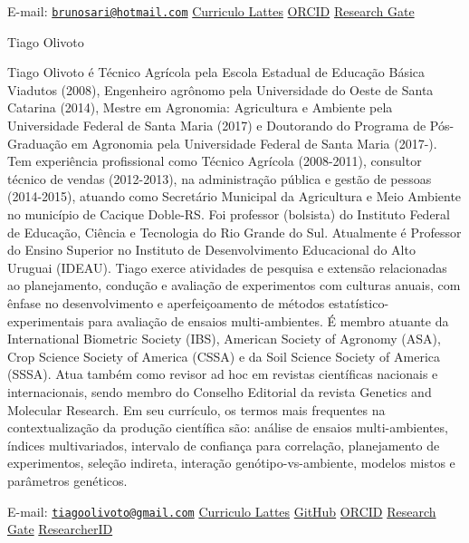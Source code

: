 \documentclass[
]{book}
\numberwithin{equation}{section}
\begin{document}
E-mail:
\href{mailto:brunosari@hotmail.com}{\nolinkurl{brunosari@hotmail.com}}
\textbar{}
\href{http://buscatextual.cnpq.br/buscatextual/visualizacv.do?id=K4406856U6}{Curriculo
Lattes} \textbar{} \href{https://orcid.org/0000-0003-3405-9628}{ORCID}
\textbar{}
\href{https://www.researchgate.net/profile/Bruno_Sari}{Research Gate}

\vspace{0.5cm}

\LARGE 
Tiago Olivoto

\normalsize
Tiago Olivoto é Técnico Agrícola pela Escola Estadual de Educação Básica Viadutos (2008), Engenheiro agrônomo pela Universidade do Oeste de Santa Catarina (2014), Mestre em Agronomia: Agricultura e Ambiente pela Universidade Federal de Santa Maria (2017) e Doutorando do Programa de Pós-Graduação em Agronomia pela Universidade Federal de Santa Maria (2017-). Tem experiência profissional como Técnico Agrícola (2008-2011), consultor técnico de vendas (2012-2013), na administração pública e gestão de pessoas (2014-2015), atuando como Secretário Municipal da Agricultura e Meio Ambiente no município de Cacique Doble-RS. Foi professor (bolsista) do Instituto Federal de Educação, Ciência e Tecnologia do Rio Grande do Sul. Atualmente é Professor do Ensino Superior no Instituto de Desenvolvimento Educacional do Alto Uruguai (IDEAU). Tiago exerce atividades de pesquisa e extensão relacionadas ao planejamento, condução e avaliação de experimentos com culturas anuais, com ênfase no desenvolvimento e aperfeiçoamento de métodos estatístico-experimentais para avaliação de ensaios multi-ambientes. É membro atuante da International Biometric Society (IBS), American Society of Agronomy (ASA), Crop Science Society of America (CSSA) e da Soil Science Society of America (SSSA). Atua também como revisor ad hoc em revistas científicas nacionais e internacionais, sendo membro do Conselho Editorial da revista Genetics and Molecular Research. Em seu currículo, os termos mais frequentes na contextualização da produção científica são: análise de ensaios multi-ambientes, índices multivariados, intervalo de confiança para correlação, planejamento de experimentos, seleção indireta, interação genótipo-vs-ambiente, modelos mistos e parâmetros genéticos.

E-mail:
\href{mailto:tiagoolivoto@gmail.com}{\nolinkurl{tiagoolivoto@gmail.com}}
\textbar{}
\href{http://buscatextual.cnpq.br/buscatextual/visualizacv.do?id=K4416862T6}{Curriculo
Lattes} \textbar{} \href{https://github.com/TiagoOlivoto}{GitHub}
\textbar{} \href{https://orcid.org/0000-0002-0241-9636}{ORCID}
\textbar{}
\href{http://buscatextual.cnpq.br/buscatextual/visualizacv.do?id=K4416862T6}{Research
Gate} \textbar{}
\href{https://publons.com/researcher/1431679/tiago-olivoto/}{ResearcherID}
\end{document}
